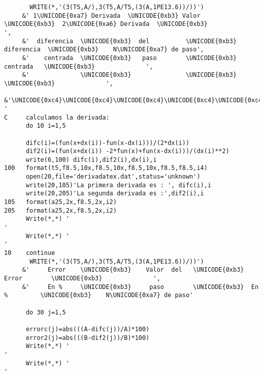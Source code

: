 \documentclass{article}
\begin{document}
\begin{verbatim}
       WRITE(*,'(3(T5,A/),3(T5,A/T5,(3(A,1PE13.6))/))')
     &' 1\UNICODE{0xa7} Derivada  \UNICODE{0xb3} Valor         \UNICODE{0xb3}  2\UNICODE{0xa6} Derivada  \UNICODE{0xb3}              ',
     &'  diferencia  \UNICODE{0xb3}  del          \UNICODE{0xb3}   diferencia  \UNICODE{0xb3}    N\UNICODE{0xa7} de paso',
     &'    centrada  \UNICODE{0xb3}   paso        \UNICODE{0xb3}    centrada   \UNICODE{0xb3}              ',
     &'              \UNICODE{0xb3}               \UNICODE{0xb3}               \UNICODE{0xb3}              ',
     &'\UNICODE{0xc4}\UNICODE{0xc4}\UNICODE{0xc4}\UNICODE{0xc4}\UNICODE{0xc4}\UNICODE{0xc4}\UNICODE{0xc4}\UNICODE{0xc4}\UNICODE{0xc4}\UNICODE{0xc4}\UNICODE{0xc4}\UNICODE{0xc4}\UNICODE{0xc4}\UNICODE{0xc4}\UNICODE{0xc5}\UNICODE{0xc4}\UNICODE{0xc4}\UNICODE{0xc4}\UNICODE{0xc4}\UNICODE{0xc4}\UNICODE{0xc4}\UNICODE{0xc4}\UNICODE{0xc4}\UNICODE{0xc4}\UNICODE{0xc4}\UNICODE{0xc4}\UNICODE{0xc4}\UNICODE{0xc4}\UNICODE{0xc4}\UNICODE{0xc4}\UNICODE{0xc5}\UNICODE{0xc4}\UNICODE{0xc4}\UNICODE{0xc4}\UNICODE{0xc4}\UNICODE{0xc4}\UNICODE{0xc4}\UNICODE{0xc4}\UNICODE{0xc4}\UNICODE{0xc4}\UNICODE{0xc4}\UNICODE{0xc4}\UNICODE{0xc4}\UNICODE{0xc4}\UNICODE{0xc4}\UNICODE{0xc4}\UNICODE{0xc5}\UNICODE{0xc4}\UNICODE{0xc4}\UNICODE{0xc4}\UNICODE{0xc4}\UNICODE{0xc4}\UNICODE{0xc4}\UNICODE{0xc4}\UNICODE{0xc4}\UNICODE{0xc4}\UNICODE{0xc4}\UNICODE{0xc4}\UNICODE{0xc4}\UNICODE{0xc4}\UNICODE{0xc4}'                                                    '
C     calculamos la derivada:
      do 10 i=1,5
 
      difc(i)=(fun(x+dx(i))-fun(x-dx(i)))/(2*dx(i))
      dif2(i)=(fun(x+dx(i)) -2*fun(x)+fun(x-dx(i)))/(dx(i)**2)
      write(6,100) difc(i),dif2(i),dx(i),i
100   format(t5,f8.5,10x,f8.5,10x,f8.5,10x,f8.5,f8.5,i4)
      open(20,file='derivadatex.dat',status='unknown')
      write(20,105)'La primera derivada es : ', difc(i),i
      write(20,205)'La segunda derivada es :',dif2(i),i
105   format(a25,2x,f8.5,2x,i2)
205   format(a25,2x,f8.5,2x,i2)
      Write(*,*) '                                                     '
      Write(*,*) '                                                     '
10    continue
       WRITE(*,'(3(T5,A/),3(T5,A/T5,(3(A,1PE13.6))/))')
     &'     Error    \UNICODE{0xb3}    Valor  del   \UNICODE{0xb3}  Error        \UNICODE{0xb3}              ',
     &'     En %     \UNICODE{0xb3}     paso        \UNICODE{0xb3}  En %         \UNICODE{0xb3}    N\UNICODE{0xa7} de paso'
 
      do 30 j=1,5
 
      errorc(j)=abs(((A-difc(j))/A)*100)
      error2(j)=abs(((B-dif2(j))/B)*100)
      Write(*,*) '                                                     '
      Write(*,*) '                                                     '
 

\end{verbatim}
\end{document}
